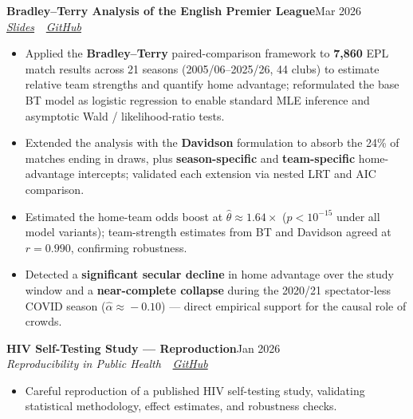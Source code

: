 \documentclass[11pt,letterpaper]{article}
\newcommand{\entry}[4]{%
  \noindent\textbf{\color{ink}#1}\hfill{\color{soft}\small #3}\\[1pt]%
  \textit{\color{muted}#2}\hfill\textit{\color{soft}\small #4}%
  \vspace{2pt}%
}
\begin{document}
\vspace{4pt}
\entry{Bradley--Terry Analysis of the English Premier League}{\href{https://docs.google.com/presentation/d/1mncW87F79ezDnqah3qGSjqWAFXMQzGMNqfB2MTYl6jM/edit}{Slides} \,\textbar\, \href{https://github.com/cedricshan/Bradley-Terry-Model-Analysis-of-the-English-Premier-League}{GitHub}}{Mar 2026}{}
\begin{itemize}
  \item Applied the \textbf{Bradley--Terry} paired-comparison framework to \textbf{7{,}860} EPL match results across 21 seasons (2005/06--2025/26, 44 clubs) to estimate relative team strengths and quantify home advantage; reformulated the base BT model as logistic regression to enable standard MLE inference and asymptotic Wald / likelihood-ratio tests.
  \item Extended the analysis with the \textbf{Davidson} formulation to absorb the 24\% of matches ending in draws, plus \textbf{season-specific} and \textbf{team-specific} home-advantage intercepts; validated each extension via nested LRT and AIC comparison.
  \item Estimated the home-team odds boost at $\hat{\theta}\!\approx\!1.64\times$ ($p\!<\!10^{-15}$ under all model variants); team-strength estimates from BT and Davidson agreed at $r\!=\!0.990$, confirming robustness.
  \item Detected a \textbf{significant secular decline} in home advantage over the study window and a \textbf{near-complete collapse} during the 2020/21 spectator-less COVID season ($\hat{\alpha}\!\approx\!-0.10$) --- direct empirical support for the causal role of crowds.
\end{itemize}

\vspace{4pt}
\entry{HIV Self-Testing Study --- Reproduction}{Reproducibility in Public Health \,\textbar\, \href{https://github.com/cedricshan/HIV-Self-Testing-Study-Reproduce}{GitHub}}{Jan 2026}{}
\begin{itemize}
  \item Careful reproduction of a published HIV self-testing study, validating statistical methodology, effect estimates, and robustness checks.
\end{itemize}
\end{document}
